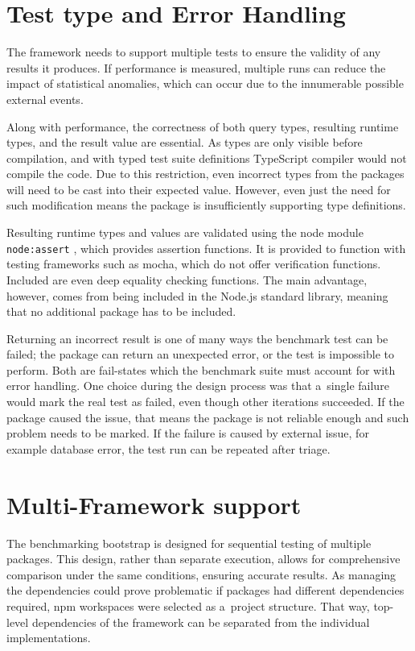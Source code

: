 \section{Test type and Error Handling}

The framework needs to support multiple tests to ensure the validity of any
results it produces. If performance is measured, multiple runs can reduce the
impact of statistical anomalies, which can occur due to the innumerable possible
external events.

Along with performance, the correctness of both query types, resulting runtime
types, and the result value are essential. As types are only visible before
compilation, and with typed test suite definitions TypeScript compiler would not
compile the code. Due to this restriction, even incorrect types from the
packages will need to be cast into their expected value. However, even just the
need for such modification means the package is insufficiently supporting type
definitions.

Resulting runtime types and values are validated using the node module
\texttt{node:assert} \cite{NodeAssert}, which provides assertion functions. It
is provided to function with testing frameworks such as mocha, which do not
offer verification functions. Included are even deep equality checking
functions. The main advantage, however, comes from being included in the Node.js
standard library, meaning that no additional package has to be included.

Returning an incorrect result is one of many ways the benchmark test can be
failed; the package can return an unexpected error, or the test is impossible to
perform. Both are fail-states which the benchmark suite must account for with
error handling. One choice during the design process was that a~single failure
would mark the real test as failed, even though other iterations succeeded. If
the package caused the issue, that means the package is not reliable enough and
such problem needs to be marked. If the failure is caused by external issue, for
example database error, the test run can be repeated after triage.

\section{Multi-Framework support}

The benchmarking bootstrap is designed for sequential testing of multiple
packages. This design, rather than separate execution, allows for comprehensive
comparison under the same conditions, ensuring accurate results. As managing the
dependencies could prove problematic if packages had different dependencies
required, npm workspaces \cite{npmWorkspaces} were selected as a~project
structure. That way, top-level dependencies of the framework can be separated
from the individual implementations.

